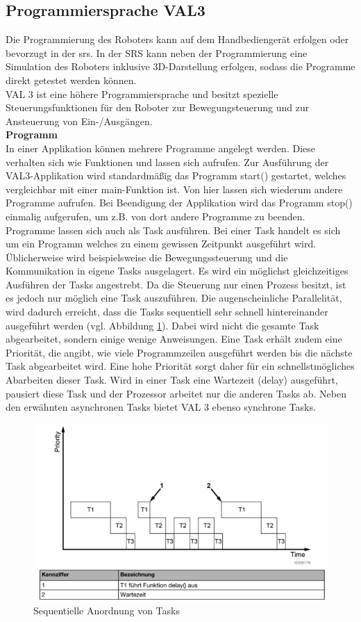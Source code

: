 \documentclass[ a4paper,
                oneside,
                toc=bibliography,
                toc=listof
                ]{scrbook}
\begin{document}
   	\subsection{Programmiersprache VAL3}
   	Die Programmierung des Roboters kann auf dem Handbediengerät erfolgen oder bevorzugt in der \ac{srs}. In der SRS kann neben der Programmierung eine Simulation des Roboters inklusive 3D-Darstellung erfolgen, sodass die Programme direkt getestet werden können.\\
   	\glqq VAL 3\grqq{} ist eine höhere Programmiersprache und besitzt spezielle Steuerungsfunktionen für den Roboter zur Bewegungsteuerung und zur Ansteuerung von Ein-/Ausgängen. \cite{VAL3}\\
   	\textbf{Programm} \\
   	In einer Applikation können mehrere Programme angelegt werden. Diese verhalten sich wie Funktionen und lassen sich aufrufen. Zur Ausführung der VAL3-Applikation wird standardmäßig das Programm \glqq start()\grqq{} gestartet, welches vergleichbar mit einer \glqq main-Funktion\grqq{} ist. Von hier lassen sich wiederum andere Programme aufrufen. Bei Beendigung der Applikation wird das Programm \glqq stop()\grqq{} einmalig aufgerufen, um z.B. von dort andere Programme zu beenden.\\
   	Programme lassen sich auch als Task ausführen. Bei einer Task handelt es sich um ein Programm welches zu einem gewissen Zeitpunkt ausgeführt wird. Üblicherweise wird beispielsweise die Bewegungssteuerung und die Kommunikation in eigene Tasks ausgelagert. Es wird ein möglichst gleichzeitiges Ausführen der Tasks angestrebt. Da die Steuerung  nur einen Prozess besitzt, ist es jedoch nur möglich eine Task auszuführen. Die augenscheinliche Parallelität, wird dadurch erreicht, dass die Tasks sequentiell sehr schnell hintereinander ausgeführt werden (vgl. Abbildung \ref{fig:tasks}). Dabei wird nicht die gesamte Task abgearbeitet, sondern einige wenige Anweisungen. Eine Task erhält zudem eine Priorität, die angibt, wie viele Programmzeilen ausgeführt werden bis die nächste Task abgearbeitet wird. Eine hohe Priorität sorgt daher für ein schnellstmögliches Abarbeiten dieser Task. Wird in einer Task eine Wartezeit (\glqq delay\grqq) ausgeführt, pausiert diese Task und der Prozessor arbeitet nur die anderen Tasks ab. Neben den erwähnten asynchronen Tasks bietet VAL 3 ebenso synchrone Tasks.
   	\begin{figure}[!ht]
   		\centering
   		\includegraphics[width=0.80\linewidth]{./images/tasks.png}
   		\caption{Sequentielle Anordnung von Tasks \cite{VAL3}} 
   		\label{fig:tasks}
   	\end{figure} \\
\end{document}
